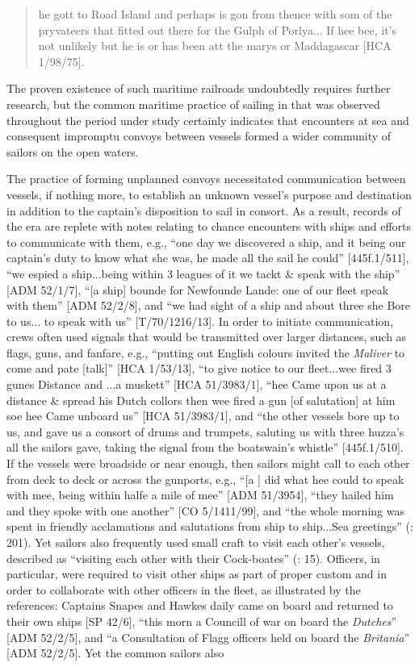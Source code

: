 \begin{quotation}
he gott to Road Island and perhaps is gon from thence with som of the pryvateers that fitted out there for the Gulph of Porlya... If hee bee, it’s not unlikely but he is or has been att the marys or Maddagascar [HCA 1/98/75]. 
\end{quotation}

The proven existence of such maritime railroads undoubtedly requires further research, but the common maritime practice of sailing in  that was observed throughout the period under study certainly indicates that encounters at sea and consequent impromptu convoys between vessels formed a wider community of sailors on the open waters. 

The practice of forming unplanned convoys necessitated communication between vessels, if nothing more, to establish an unknown vessel’s purpose and destination in addition to the captain’s disposition to sail in consort. As a result, records of the era are replete with notes relating to chance encounters with ships and efforts to communicate with them, e.g., “one day we discovered a ship, and it being our captain’s duty to know what she was, he made all the sail he could” [445f.1/511], “we espied a ship...being within 3 leagues of it we tackt \& speak with the ship” [ADM 52/1/7], “[a ship] bounde for Newfounde Lande: one of our fleet speak with them” [ADM 52/2/8], and “we had sight of a ship and about three she Bore to us... to speak with us” [T/70/1216/13]. In order to initiate communication, crews often used signals that would be transmitted over larger distances, such as flags, guns, and fanfare, e.g., “putting out English colours invited the \textit{Maliver} to come and pate [talk]” [HCA 1/53/13], “to give notice to our fleet...wee fired 3 gunes Distance and ...a muskett” [HCA 51/3983/1], “hee Came upon us at a distance \& spread his Dutch collors then wee fired a gun [of salutation] at him soe hee Came unboard us” [HCA 51/3983/1], and “the other vessels bore up to us, and gave us a consort of drums and trumpets, saluting us with three huzza’s all the sailors gave, taking the signal from the boatswain’s whistle”  [445f.1/510]. If the vessels were broadside or near enough, then sailors might call to each other from deck to deck or across the gunports, e.g., “[a ] did what hee could to speak with mee, being within halfe a mile of mee” [ADM 51/3954], “they hailed him and they spoke with one another” [CO 5/1411/99], and “the whole morning was spent in friendly acclamations and salutations from ship to ship...Sea greetings” (\citealt{Gage1648}: 201). Yet sailors also frequently used small craft to visit each other’s vessels, described as “visiting each other with their Cock-boates” (\citealt{Gage1648}: 15).  Officers, in particular, were required to visit other ships as part of proper custom and in order to collaborate with other officers in the fleet, as illustrated by the references: Captains Snapes and Hawkes daily came on board and returned to their own ships [SP 42/6], “this morn a Councill of war on board the \textit{Dutches}” [ADM 52/2/5], and “a Consultation of Flagg officers held on board the \textit{Britania}” [ADM 52/2/5]. Yet the common sailors also 